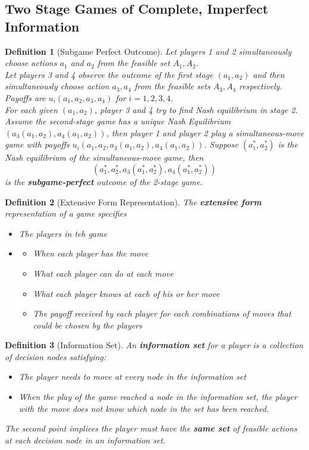 \documentclass[12pt]{article}
\newtheorem{definition}{Definition}[section]
\theoremstyle{definition}
\begin{document}
\subsection{Two Stage Games of Complete, Imperfect Information}
\begin{definition}[Subgame Perfect Outcome]
\normalfont 
Let players 1 and 2 simultaneously choose actions $a_1$ and $a_2$ from the feasible set $A_1, A_2$.\\
Let players 3 and 4 observe the outcome of the first stage $(a_1,a_2)$ and then simultaneously choose action $a_3, a_4$ from the feasible sets $A_3, A_4$ respectively.\\
Payoffs are $u_i(a_1,a_2,a_3,a_4)$ for $i=1,2,3,4$.\\
For each given $(a_1, a_2)$, player 3 and 4 try to find Nash equilibrium in stage 2. Assume the second-stage game has a unique Nash Equilibrium $(a_3(a_1, a_2), a_4(a_1,a_2))$, then player 1 and player 2 play a simultaneous-move game with payoffs $u_i(a_1,a_2,a_3(a_1,a_2), a_4(a_1,a_2))$. Suppose $(a_1^\ast, a_2^\ast)$ is the Nash equilibrium of the simultaneous-move game, then
\[
(a_1^\ast, a_2^\ast, a_3(a_1^\ast, a_2^\ast), a_4(a_1^\ast, a_2^\ast))
\]
is the \textbf{subgame-perfect} outcome of the 2-stage game.
\end{definition}
\begin{definition}[Extensive Form Representation]
\normalfont The \textbf{extensive form} representation of a game specifies
\begin{itemize}
  \item The players in teh game
  \item \begin{itemize}
  \item When each player has the move
  \item What each player can do at each move
  \item What each player knows at each of his or her move
  \item The payoff received by each player for each combinations of moves that could be chosen by the players
  \end{itemize}
\end{itemize}
\end{definition}
\begin{definition}[Information Set]
\normalfont An \textbf{information set} for a player is a collection of decision nodes satisfying:
\begin{itemize}
  \item The player needs to move at every node in the information set
  \item When the play of the game reached a node in the information set, the player with the move does not know which node in the set has been reached.
\end{itemize}
The second point impliees the player must have the \textbf{same set} of feasible actions at each decision node in an information set.
\end{definition}
\end{document}
